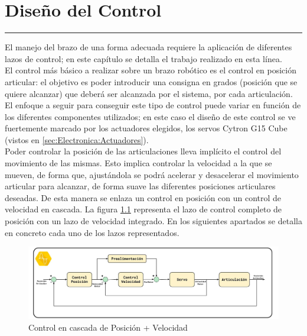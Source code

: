 \chapter{Diseño del Control} \label{chap:Control}
\hrule
\vspace{3mm}

El manejo del brazo de una forma adecuada requiere la aplicación de diferentes lazos de control; en este capítulo se detalla el trabajo realizado en esta línea.
\\

El control más básico a realizar sobre un brazo robótico es el control en posición articular: el objetivo es poder introducir una consigna en grados (posición que se quiere alcanzar) que deberá ser alcanzada por el sistema, por cada articulación. El enfoque a seguir para conseguir este tipo de control puede variar en función de los diferentes componentes utilizados; en este caso el diseño de este control se ve fuertemente marcado por los actuadores elegidos, los servos Cytron G15 Cube (vistos en \ref{sec:Electronica:Actuadores}).
\\

Poder controlar la posición de las articulaciones lleva implícito el control del movimiento de las mismas. Esto implica controlar la velocidad a la que se mueven, de forma que, ajustándola se podrá acelerar y desacelerar el movimiento articular para alcanzar, de forma suave las diferentes posiciones articulares deseadas. De esta manera se enlaza un control en posición con un control de velocidad en cascada. La figura \ref{fig:Control:control_cascada} representa el lazo de control completo de posición con un lazo de velocidad integrado. En los siguientes apartados se detalla en concreto cada uno de los lazos representados.


\begin{figure}[H]
    \centering
    \includegraphics[width=1\textwidth]{figuras/Imagenes_Control/control_cascada.jpg}
    \caption{Control en cascada de Posición + Velocidad}
    \label{fig:Control:control_cascada}
\end{figure}

